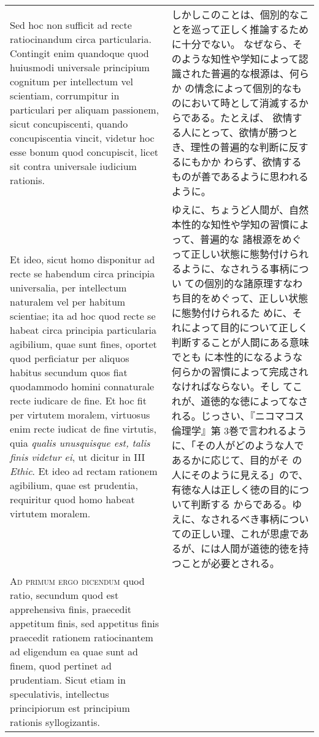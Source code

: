 \documentclass[10pt]{jsarticle}
\begin{document}
\begin{longtable}{p{21em}p{21em}}
\\


Sed hoc non sufficit ad recte ratiocinandum circa
particularia. Contingit enim quandoque quod huiusmodi universale
principium cognitum per intellectum vel scientiam, corrumpitur in
particulari per aliquam passionem, sicut concupiscenti, quando
concupiscentia vincit, videtur hoc esse bonum quod concupiscit, licet
sit contra universale iudicium rationis.

&

しかしこのことは、個別的なことを巡って正しく推論するために十分でない。
なぜなら、そのような知性や学知によって認識された普遍的な根源は、何らか
の情念によって個別的なものにおいて時として消滅するからである。たとえば、
欲情する人にとって、欲情が勝つとき、理性の普遍的な判断に反するにもかか
わらず、欲情するものが善であるように思われるように。

\\

Et ideo, sicut homo disponitur ad recte se habendum circa principia
universalia, per intellectum naturalem vel per habitum scientiae; ita
ad hoc quod recte se habeat circa principia particularia agibilium,
quae sunt fines, oportet quod perficiatur per aliquos habitus secundum
quos fiat quodammodo homini connaturale recte iudicare de fine. Et hoc
fit per virtutem moralem, virtuosus enim recte iudicat de fine
virtutis, quia {\itshape qualis unusquisque est, talis finis videtur
ei}, ut dicitur in III {\itshape Ethic}. Et ideo ad rectam rationem
agibilium, quae est prudentia, requiritur quod homo habeat virtutem
moralem.


&

ゆえに、ちょうど人間が、自然本性的な知性や学知の習慣によって、普遍的な
諸根源をめぐって正しい状態に態勢付けられるように、なされうる事柄につい
ての個別的な諸原理すなわち目的をめぐって、正しい状態に態勢付けられるた
めに、それによって目的について正しく判断することが人間にある意味でとも
に本性的になるような何らかの習慣によって完成されなければならない。そし
てこれが、道徳的な徳によってなされる。じっさい、『ニコマコス倫理学』第
3巻で言われるように、「その人がどのような人であるかに応じて、目的がそ
の人にそのように見える」ので、有徳な人は正しく徳の目的について判断する
からである。ゆえに、なされるべき事柄についての正しい理、これが思慮であ
るが、には人間が道徳的徳を持つことが必要とされる。

\\



{\scshape Ad primum ergo dicendum} quod ratio, secundum quod est
apprehensiva finis, praecedit appetitum finis, sed appetitus finis
praecedit rationem ratiocinantem ad eligendum ea quae sunt ad finem,
quod pertinet ad prudentiam. Sicut etiam in speculativis, intellectus
principiorum est principium rationis syllogizantis.



\end{longtable}
\end{document}
